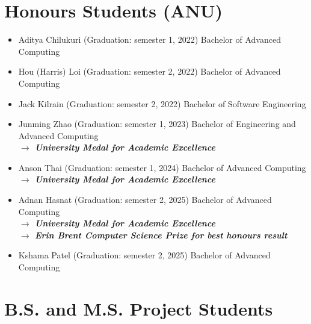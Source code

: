\documentclass[singlecolumn,singlespace,11pt,a4paper]{article}
\begin{document}
\section*{Honours Students (ANU)}

\begin{itemize}

\item Aditya Chilukuri (Graduation: semester 1, 2022) Bachelor of Advanced Computing 
\item Hou (Harris) Loi (Graduation: semester 2, 2022) Bachelor of Advanced Computing 
\item Jack Kilrain (Graduation: semester 2, 2022) Bachelor of Software Engineering 
\item Junming Zhao (Graduation: semester 1, 2023) Bachelor of Engineering and Advanced Computing 
\\
{\color{BrickRed} \textbf{$\longrightarrow$ \emph{University Medal for Academic Excellence}}}
\item Anson Thai (Graduation: semester 1, 2024) Bachelor of Advanced Computing
\\
{\color{BrickRed} \textbf{$\longrightarrow$ \emph{University Medal for Academic Excellence}}}
\item Adnan Hasnat (Graduation: semester 2, 2025) Bachelor of Advanced Computing
\\
{\color{BrickRed} \textbf{$\longrightarrow$ \emph{University Medal for Academic Excellence}}}
\\
{\color{BrickRed} \textbf{$\longrightarrow$ \emph{Erin Brent Computer Science Prize for best honours result}}}
\item Kshama Patel (Graduation: semester 2, 2025) Bachelor of Advanced Computing

\end{itemize}

\section*{B.S. and M.S. Project Students}
\end{document}
